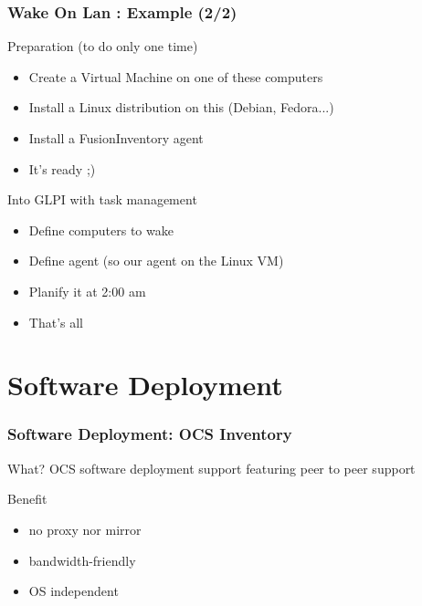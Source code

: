 \documentclass{beamer}
\begin{document}
\begin{frame}
    \frametitle{Wake On Lan : Example (2/2)}

    \begin{block}{Preparation (to do only one time)}
    \begin{itemize}
    \item Create a Virtual Machine on one of these computers
    \item Install a Linux distribution on this (Debian, Fedora...)
    \item Install a FusionInventory agent
    \item It's ready ;)
    \end{itemize}
    \end{block}

    \begin{block}{Into GLPI with task management}
    \begin{itemize}
    \item Define computers to wake
    \item Define agent (so our agent on the Linux VM)
    \item Planify it at 2:00 am
    \item That's all
    \end{itemize}
    \end{block}

\end{frame}

\section{Software Deployment}

\begin{frame}
    \frametitle{Software Deployment: OCS Inventory}

    \begin{block}{What?}
    OCS software deployment support featuring peer to peer support
    \end{block}

    \begin{block}{Benefit}
    \begin{itemize}
        \item no proxy nor mirror
        \item bandwidth-friendly
        \item OS independent
    \end{itemize}
    \end{block}
\end{frame}
\end{document}

